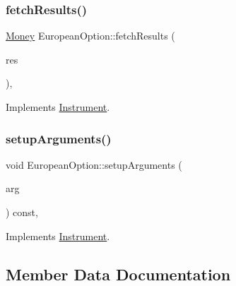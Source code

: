 \subsubsection{\texorpdfstring{fetch\+Results()}{fetchResults()}}
{\footnotesize\ttfamily \hyperlink{_name_def_8h_a5a9d48c16a694e9a2d9f1eca730dc8c5}{Money} European\+Option\+::fetch\+Results (\begin{DoxyParamCaption}\item[{\hyperlink{class_pricing_engine_1_1_results}{Pricing\+Engine\+::\+Results} $\ast$const}]{res }\end{DoxyParamCaption})\hspace{0.3cm}{\ttfamily [override]}, {\ttfamily [virtual]}}



Implements \hyperlink{class_instrument_a381f093402f789ad7c0ffecd233167dc}{Instrument}.

\hypertarget{class_european_option_a94c1826feba0099400bce8dd6fc01cb9}{}\label{class_european_option_a94c1826feba0099400bce8dd6fc01cb9} 
\subsubsection{\texorpdfstring{setup\+Arguments()}{setupArguments()}}
{\footnotesize\ttfamily void European\+Option\+::setup\+Arguments (\begin{DoxyParamCaption}\item[{\hyperlink{class_pricing_engine_1_1_arguments}{Pricing\+Engine\+::\+Arguments} $\ast$}]{arg }\end{DoxyParamCaption}) const\hspace{0.3cm}{\ttfamily [override]}, {\ttfamily [virtual]}}



Implements \hyperlink{class_instrument_ac0f78fd32a360abde0c31b5bc01c7e67}{Instrument}.



\subsection{Member Data Documentation}
\hypertarget{class_european_option_a8853b9bd1af9abc371630ae1c68f304c}{}\label{class_european_option_a8853b9bd1af9abc371630ae1c68f304c} 
